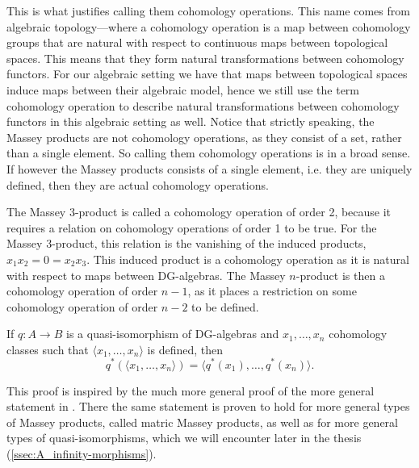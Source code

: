This is what justifies calling them cohomology operations. This name comes  from algebraic topology---where a cohomology operation is a map between cohomology groups that are natural with respect to continuous maps between topological spaces. This means that they form natural transformations between cohomology functors. For our algebraic setting we have that maps between topological spaces induce maps between their algebraic model, hence we still use the term cohomology operation to describe natural transformations between cohomology functors in this algebraic setting as well. Notice that strictly speaking, the Massey products are not cohomology operations, as they consist of a set, rather than a single element. So calling them cohomology operations is in a broad sense. If however the Massey products consists of a single element, i.e. they are uniquely defined, then they are actual cohomology operations. 

The Massey 3-product is called a cohomology operation of order 2, because it requires a relation on cohomology operations of order 1 to be true. For the Massey 3-product, this relation is the vanishing of the induced products, $x_1 x_2 = 0 = x_2 x_3$. This induced product is a cohomology operation as it is natural with respect to maps between DG-algebras. The Massey $n$-product is then a cohomology operation of order $n-1$, as it places a restriction on some cohomology operation of order $n-2$ to be defined.   


\begin{theorem}
\label{thm:quasi_preserves_massey}
If $q\colon A\longrightarrow B$ is a quasi-isomorphism of DG-algebras and $x_1, \ldots, x_n$ cohomology classes such that $\langle x_1, \ldots, x_n\rangle$ is defined, then 
\begin{equation*}
    q^*(\langle x_1, \ldots, x_n\rangle) = \langle q^*(x_1),\ldots, q^*(x_n)\rangle .
\end{equation*}
\end{theorem}

This proof is inspired by the much more general proof of the more general statement in \cite[Theorem 1.5]{naturality}. There the same statement is proven to hold for more general types of Massey products, called matric Massey products, as well as for more general types of quasi-isomorphisms, which we will encounter later in the thesis (\cref{ssec:A_infinity-morphisms}). 

